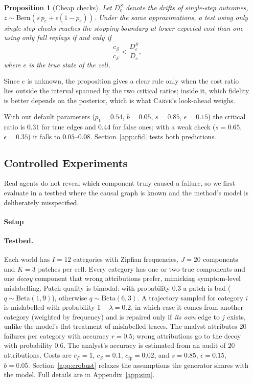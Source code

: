 \documentclass[11pt]{article}
\newtheorem{proposition}{Proposition}
\newcommand{\carve}{\textsc{Carve}}
\begin{document}
\begin{proposition}[Cheap checks]
\label{prop:cfid}
Let $D^S_e$ denote the drifts of single-step outcomes, $z\sim\mathrm{Bern}(s\,p_e+\epsilon(1-p_e))$. Under the same approximations, a test using only single-step checks reaches the stopping boundary at lower expected cost than one using only full replays if and only if
\begin{equation}
\frac{c_S}{c_F} < \frac{D^S_e}{D_e},
\end{equation}
where $e$ is the true state of the cell.
\end{proposition}

Since $e$ is unknown, the proposition gives a clear rule only when the cost ratio lies outside the interval spanned by the two critical ratios; inside it, which fidelity is better depends on the posterior, which is what \carve{}'s look-ahead weighs.

With our default parameters ($p_1=0.54$, $b=0.05$, $s=0.85$, $\epsilon=0.15$) the critical ratio is $0.31$ for true edges and $0.44$ for false ones; with a weak check ($s=0.65$, $\epsilon=0.35$) it falls to $0.05$--$0.08$. Section~\ref{app:cfid} tests both predictions.


\subsection{Controlled Experiments}
\label{app:csim}

Real agents do not reveal which component truly caused a failure, so we first evaluate in a testbed where the causal graph is known and the method's model is deliberately misspecified.

\paragraph{Setup}
\paragraph{Testbed.} Each world has $I=12$ categories with Zipfian frequencies, $J=20$ components and $K=3$ patches per cell. Every category has one or two true components and one \emph{decoy} component that wrong attributions prefer, mimicking symptom-level mislabelling. Patch quality is bimodal: with probability 0.3 a patch is bad ($q\sim\mathrm{Beta}(1,9)$), otherwise $q\sim\mathrm{Beta}(6,3)$. A trajectory sampled for category $i$ is mislabelled with probability $1-\lambda=0.2$, in which case it comes from another category (weighted by frequency) and is repaired only if \emph{its own} edge to $j$ exists, unlike the model's flat treatment of mislabelled traces. The analyst attributes 20 failures per category with accuracy $r=0.5$; wrong attributions go to the decoy with probability 0.6. The analyst's accuracy is estimated from an audit of 20 attributions. Costs are $c_F=1$, $c_S=0.1$, $c_{\mathrm{fp}}=0.02$, and $s=0.85$, $\epsilon=0.15$, $b=0.05$. Section~\ref{app:crobust} relaxes the assumptions the generator shares with the model. Full details are in Appendix~\ref{app:sim}.
\end{document}
